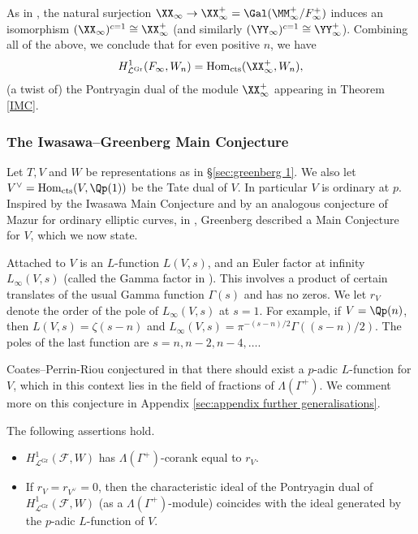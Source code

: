 \documentclass[a4paper,10pt, english, reqno]{smfart}
\newcommand{\cF}{\mathcal{F}}
\numberwithin{equation}{section}
\begin{document}
As in \cite[p.6]{CS06}, the natural surjection $\XX_\infty \to \XX_\infty^+ = \Gal(\MM_\infty^+/F_\infty^+)$ induces an isomorphism $(\XX_\infty)^{c = 1} \cong \XX_\infty^+$ (and similarly $(\YY_\infty)^{c = 1} \cong \YY_\infty^+$).  Combining all of the above, we conclude that for even positive $n$, we have
\[
    H^1_{\mathcal{L}^{\mathrm{Gr}}}(F_\infty, W_n) = \mathrm{Hom}_{\mathrm{cts}}(\XX_\infty^+, W_n),
\]
(a twist of) the Pontryagin dual of the module $\XX_\infty^+$ appearing in Theorem \ref{IMC}. 




\subsubsection{The Iwasawa--Greenberg Main Conjecture}

Let $T, V$ and $W$ be representations as in \S\ref{sec:greenberg 1}.  We also let $V^\vee = \mathrm{Hom}_{\mathrm{cts}}(V,\Qp(1))$ be the Tate dual of $V$. In particular $V$ is ordinary at $p$. Inspired by the Iwasawa Main Conjecture and by an analogous conjecture of Mazur for ordinary elliptic curves, in \cite{Gre89}, Greenberg described a Main Conjecture for $V$, which we now state.


Attached to $V$ is an $L$-function $L(V,s)$, and an Euler factor at infinity $L_\infty(V,s)$ (called the Gamma factor in \cite{Gre89}).  This involves a product of certain translates of the usual Gamma function $\Gamma(s)$ and  has no zeros. We let $r_V$ denote the order of the pole of $L_\infty(V,s)$ at $s=1$. For example, if $V = \Qp(n)$, then $L(V, s) = \zeta(s-n)$ and $L_\infty(V, s) = \pi^{-(s-n)/2}\Gamma((s-n)/ 2)$. The poles of the last function are $s = n, n-2, n-4, \ldots$.

Coates--Perrin-Riou conjectured in \cite{coatesperrinriou89} that there should exist a $p$-adic $L$-function for $V$, which in this context lies in the field of fractions of $\Lambda(\Gamma^+)$. We comment more on this conjecture in Appendix \ref{sec:appendix further generalisations}. 



\begin{conj} [Greenberg]
The following assertions hold.
\begin{itemize}
\item[(i)] $H^1_{\mathcal{L}^{\mathrm{Gr}}}(\cF, W)$ has $\Lambda(\Gamma^+)$-corank equal to $r_V$. 
\item[(ii)] If $r_V = r_{V^\vee} = 0$, then the characteristic ideal of the Pontryagin dual of $H^1_{\mathcal{L}^{\mathrm{Gr}}}(\cF, W)$ (as a $\Lambda(\Gamma^+)$-module) coincides with the ideal generated by the $p$-adic $L$-function of $V$.
\end{itemize}
\end{conj}
\end{document}
